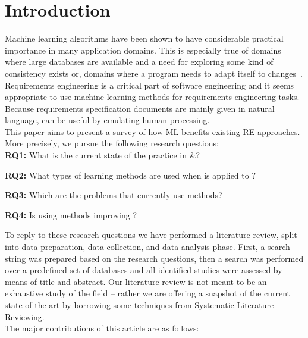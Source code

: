 \section{Introduction}

% 
% 
% 
% 
Machine learning algorithms have been shown to have considerable practical
importance in many application domains. This is especially true of domains where
large databases are available and a need for exploring some kind of consistency
exists or, domains where a program needs to adapt itself to
changes~\cite{Zhang2002}. Requirements engineering is a critical part of
software engineering and it seems appropriate to use machine learning methods
for requirements engineering tasks. Because requirements specification documents
are mainly given in natural language, \ML can be useful by emulating human
processing.
\\
This paper aims to present a survey of how ML benefits existing RE
approaches. More precisely, we pursue the following research questions: \\
\noindent
\textbf{RQ1:} What is the current state of the practice in \ML${\&}$\RE?

\noindent
\textbf{RQ2:} What types of learning methods are used when \ML is applied to
\RE?

\noindent
\textbf{RQ3:} Which are the \RE problems that currently use \ML methods?

\noindent
\textbf{RQ4:} Is using \ML methods improving \RE?

To reply to these research questions we have performed a literature review,
split into data preparation, data collection, and data analysis phase. First, a search string
was prepared based on the research questions, then a search was performed over a
predefined set of databases and all identified studies were assessed by means of
title and abstract. Our literature review is not meant to be an exhaustive study
of the field -- rather we are offering a snapshot of the current
state-of-the-art by borrowing some techniques from Systematic Literature
Reviewing.\\
The major contributions of this article are as follows:

